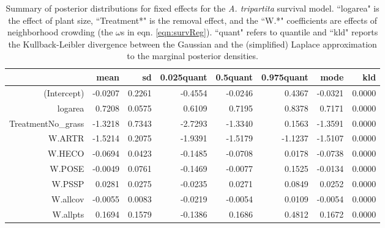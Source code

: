 \documentclass[11pt]{article}
\begin{document}
\begin{table}[ht]
\centering
\caption{Summary of posterior distributions for fixed effects for the \textit{A. tripartita} survival model. ``logarea" is the effect of plant size, ``Treatment*" is the removal effect, and the ``W.*" coefficients are effects of neighborhood crowding (the $\omega$s in eqn. \ref{eqn:survReg}). ``quant" refers to quantile and ``kld" reports the Kullback-Leibler divergence between the Gaussian and the (simplified) Laplace approximation to the marginal posterior densities. } 
\label{ARTRsurvival}
\begin{tabular}{rrrrrrrr}
  \hline
 & mean & sd & 0.025quant & 0.5quant & 0.975quant & mode & kld \\ 
  \hline
(Intercept) & -0.0207 & 0.2261 & -0.4554 & -0.0246 & 0.4367 & -0.0321 & 0.0000 \\ 
  logarea & 0.7208 & 0.0575 & 0.6109 & 0.7195 & 0.8378 & 0.7171 & 0.0000 \\ 
  TreatmentNo\_grass & -1.3218 & 0.7343 & -2.7293 & -1.3340 & 0.1563 & -1.3591 & 0.0000 \\ 
  W.ARTR & -1.5214 & 0.2075 & -1.9391 & -1.5179 & -1.1237 & -1.5107 & 0.0000 \\ 
  W.HECO & -0.0694 & 0.0423 & -0.1485 & -0.0708 & 0.0178 & -0.0738 & 0.0000 \\ 
  W.POSE & -0.0049 & 0.0761 & -0.1469 & -0.0077 & 0.1525 & -0.0134 & 0.0000 \\ 
  W.PSSP & 0.0281 & 0.0275 & -0.0235 & 0.0271 & 0.0849 & 0.0252 & 0.0000 \\ 
  W.allcov & -0.0055 & 0.0083 & -0.0219 & -0.0054 & 0.0109 & -0.0054 & 0.0000 \\ 
  W.allpts & 0.1694 & 0.1579 & -0.1386 & 0.1686 & 0.4812 & 0.1672 & 0.0000 \\ 
   \hline
\end{tabular}
\end{table}
\end{document}

